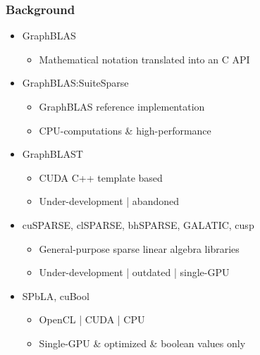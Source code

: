 \documentclass[aspectratio=169,xcolor=table,english]{beamer}
\begin{document}
\begin{frame}[fragile] \frametitle{Background}
    \begin{minipage}[m]{0.7\linewidth}
        \begin{itemize}
        \item GraphBLAS
        {
        \begin{itemize}
            \item Mathematical notation translated into an C API
        \end{itemize}
        }
        \item GraphBLAS:SuiteSparse
        {
        \begin{itemize}
            \item GraphBLAS reference implementation
            \item CPU-computations \& high-performance
        \end{itemize}
        }
        \item GraphBLAST
        {
        \begin{itemize}
            \item CUDA C++ template based
            \item Under-development | abandoned
        \end{itemize}
        }
        \item cuSPARSE, clSPARSE, bhSPARSE, GALATIC, cusp
        {
        \begin{itemize}
            \item General-purpose sparse linear algebra libraries
            \item Under-development | outdated | single-GPU
        \end{itemize}
        }
        \item SPbLA, cuBool
        {
        \begin{itemize}
            \item OpenCL | CUDA | CPU
            \item Single-GPU \& optimized \& boolean values only
        \end{itemize}
        }
        \end{itemize}
    \end{minipage}\hfill
    \begin{minipage}[m]{0.3\linewidth}
        \begin{figure}
            \centering

\end{figure}
\end{minipage}
\end{frame}
\end{document}
